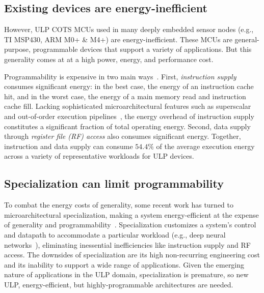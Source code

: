 \subsection{Existing devices are energy-inefficient}
However, ULP COTS MCUs used in many deeply embedded sensor nodes
(e.g., TI MSP430, ARM M0+ \& M4+) are energy-inefficient.
%
These MCUs are general-purpose, programmable devices that support a variety of
applications.
% 
But this generality comes at at a high power, energy, and performance cost.

Programmability is expensive in two main ways~\cite{horowitz:isscc14:energy-keynote,hameed2010understanding,balfour_elm_thesis}.
First, \emph{instruction supply} consumes significant energy: in the best case, the energy of
an instruction cache hit, and in the worst case, the energy of a main memory
read and instruction cache fill.  
%
Lacking sophisticated microarchitectural features such as superscalar and
out-of-order execution pipelines~\cite{msp430fr5994,traber2016pulpino}, the energy overhead of
instruction supply constitutes a significant fraction of total operating energy.
%
Second, data supply through \emph{register file (RF) access} also consumes significant energy.
%
Together, instruction and data supply can consume
$54.4\%$ of the average execution energy across a variety of representative workloads for ULP devices.

\subsection{Specialization can limit programmability}
To combat the energy costs of generality, some recent work has turned to
microarchitectural specialization, making a system energy-efficient at the
expense of generality and
programmability~\cite{chen:isca16:eyeriss,chen:asplos14:diannao,du:isca15:shidiannao,liu:isca15:pudiannao,chen2014dadiannao,venkatesh2010conservation}.
% 
Specialization customizes a system's control and datapath to accommodate a
particular workload (e.g., deep neural networks~\cite{chen:isca16:eyeriss,chen:asplos14:diannao}),
eliminating inessential inefficiencies like instruction supply and RF access.
% 
The downsides of specialization are its high non-recurring engineering cost and its inability to support a wide range of applications.
% 
Given the emerging nature of applications in the ULP domain, specialization is premature, so new ULP, energy-efficient, but highly-programmable architectures are needed.

